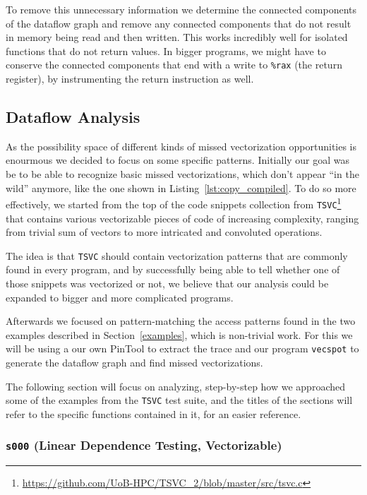 \documentclass[acmsmall,review, nonacm]{acmart}
\begin{document}
To remove this unnecessary information we determine the connected components of the dataflow graph
and remove any connected components that do not result in memory being read and then written. 
This works incredibly well for isolated functions that do not return values. In bigger programs,
we might have to conserve the connected components that end with a write to \texttt{\%rax} (the return register),
by instrumenting the return instruction as well.

\subsection{Dataflow Analysis}
As the possibility space of different kinds of missed vectorization opportunities is enourmous we decided to focus on some specific patterns.
Initially our goal was be to be able to recognize basic missed vectorizations, which don't appear ``in the wild'' anymore, like the one shown in Listing~\ref{lst:copy_compiled}. 
To do so more effectively, we started from the top of the code snippets collection from \texttt{TSVC}\footnote{\url{https://github.com/UoB-HPC/TSVC_2/blob/master/src/tsvc.c}} that contains
various vectorizable pieces of code of increasing complexity, ranging from trivial sum of vectors to more intricated and convoluted operations.

The idea is that \texttt{TSVC} should contain vectorization patterns that are commonly found in every program, 
and by successfully being able to tell whether one of those snippets was vectorized or not, we believe that our
analysis could be expanded to bigger and more complicated programs.

Afterwards we focused on pattern-matching the access patterns found in the two examples described in Section~\ref{examples}, which is non-trivial work.
For this we will be using a our own PinTool to extract the trace and our program 
\texttt{vecspot} to generate the dataflow graph and find missed vectorizations.

The following section will focus on analyzing, step-by-step how we approached some of the examples from the \texttt{TSVC} test suite, 
and the titles of the sections will refer to the specific functions contained in it, for an easier reference.

\subsubsection{\texttt{s000} (Linear Dependence Testing, Vectorizable)}
\end{document}
